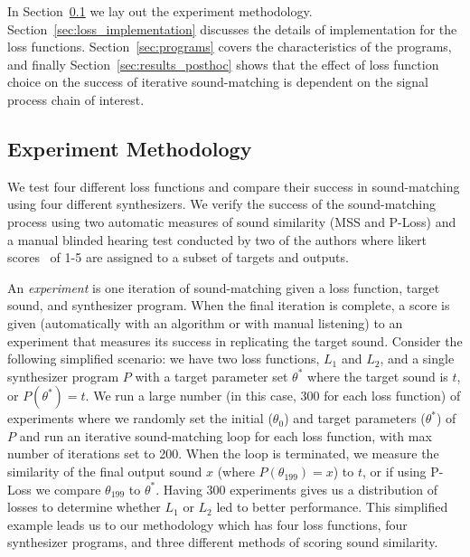 \documentclass[lettersize,journal]{IEEEtran}
\newcommand{\LossSelect}{\textbf{Loss Selection}}
\newcommand{\SynthSelect}{\textbf{Synthesis Selection}}
\begin{document}
In Section~\ref{sec:methodology} we lay out the experiment methodology. Section~\ref{sec:loss_implementation} discusses the details of implementation for the loss functions. Section~\ref{sec:programs} covers the characteristics of the programs, and finally Section~\ref{sec:results_posthoc} shows that the effect of loss function choice on the success of iterative sound-matching is dependent on the signal process chain of interest. 

\subsection{Experiment Methodology}
\label{sec:methodology}

We test four different loss functions and compare their success in sound-matching using four different synthesizers. We verify the success of the sound-matching process using two automatic measures of sound similarity (MSS and P-Loss) and a manual blinded hearing test conducted by two of the authors where likert scores~\cite{jebb2021review} of 1-5 are assigned to a subset of targets and outputs. 

An \textit{experiment} is one iteration of sound-matching given a loss function, target sound,
and synthesizer program. When the final iteration is complete, a score is given (automatically with an algorithm or with manual listening) to an experiment that measures its success in replicating the target sound. Consider the following simplified scenario: we have two loss functions, $L_1$ and $L_2$, and a single synthesizer program $P$ with a target parameter set $\theta^*$ where the target sound is $t$, or $P(\theta^*) = t$. We run a large number (in this case, 300 for each loss function) of experiments where we randomly set the initial ($\theta_0$) and target parameters ($\theta^*$) of $P$ and run an iterative sound-matching loop for each loss function, with max number of iterations set to 200. When the loop is terminated, we measure the similarity of the final output sound $x$ (where $P(\theta_{199}) = x$) to $t$, or if using P-Loss we compare $\theta_{199}$ to $\theta^*$. Having 300 experiments gives us a distribution of losses to determine whether $L_1$ or $L_2$ led to better performance. This simplified example leads us to our methodology which has four loss functions, four synthesizer programs, and three different methods of scoring sound similarity.
\end{document}
